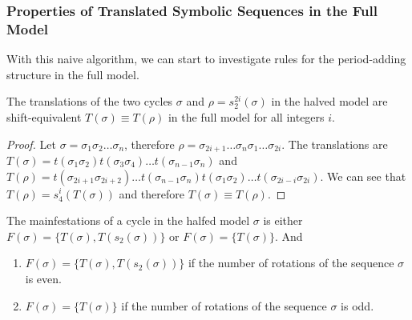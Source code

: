 \subsubsection{Properties of Translated Symbolic Sequences in the Full Model}

With this naive algorithm, we can start to investigate rules for the period-adding structure in the full model.

\begin{lemma}
    \label{lemma:equivalence.translations}
    The translations of the two cycles $\sigma$ and $\rho = s_2^{2i}(\sigma)$ in the halved model are shift-equivalent $T(\sigma) \equiv T(\rho)$ in the full model for all integers $i$.
\end{lemma}

\begin{proof}
    Let $\sigma = \sigma_1\sigma_2 \dots \sigma_n$, therefore $\rho = \sigma_{2i+1} \dots \sigma_n\sigma_1 \dots \sigma_{2i}$.
    The translations are $T(\sigma) = t(\sigma_1\sigma_2)t(\sigma_3\sigma_4) \dots t(\sigma_{n-1}\sigma_n)$
    and $T(\rho) = t(\sigma_{2i+1}\sigma_{2i+2}) \dots t(\sigma_{n-1}\sigma_n)t(\sigma_1\sigma_2) \dots t(\sigma_{2i-i}\sigma_{2i})$.
    We can see that $T(\rho) = s_4^i(T(\sigma))$ and therefore $T(\sigma) \equiv T(\rho)$.
\end{proof}

\begin{theorem}
    \label{theorem:coexistence.even}
    The mainfestations of a cycle in the halfed model $\sigma$ is either $F(\sigma) = \{T(\sigma), T(s_2(\sigma))\}$ or $F(\sigma) = \{T(\sigma)\}$.
    And \begin{enumerate}
        \item $F(\sigma) = \{T(\sigma), T(s_2(\sigma))\}$ if the number of rotations of the sequence $\sigma$ is even.
        \item $F(\sigma) = \{T(\sigma)\}$ if the number of rotations of the sequence $\sigma$ is odd.
    \end{enumerate}
\end{theorem}

